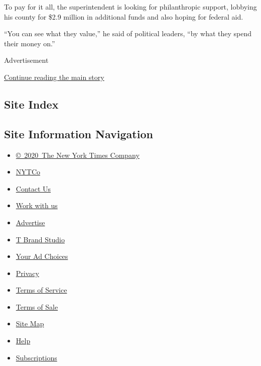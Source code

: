 To pay for it all, the superintendent is looking for philanthropic
support, lobbying his county for \$2.9 million in additional funds and
also hoping for federal aid.

``You can see what they value,'' he said of political leaders, ``by what
they spend their money on.''

Advertisement

\protect\hyperlink{after-bottom}{Continue reading the main story}

\hypertarget{site-index}{%
\subsection{Site Index}\label{site-index}}

\hypertarget{site-information-navigation}{%
\subsection{Site Information
Navigation}\label{site-information-navigation}}

\begin{itemize}
\tightlist
\item
  \href{https://help.nytimes3xbfgragh.onion/hc/en-us/articles/115014792127-Copyright-notice}{©~2020~The
  New York Times Company}
\end{itemize}

\begin{itemize}
\tightlist
\item
  \href{https://www.nytco.com/}{NYTCo}
\item
  \href{https://help.nytimes3xbfgragh.onion/hc/en-us/articles/115015385887-Contact-Us}{Contact
  Us}
\item
  \href{https://www.nytco.com/careers/}{Work with us}
\item
  \href{https://nytmediakit.com/}{Advertise}
\item
  \href{http://www.tbrandstudio.com/}{T Brand Studio}
\item
  \href{https://www.nytimes3xbfgragh.onion/privacy/cookie-policy\#how-do-i-manage-trackers}{Your
  Ad Choices}
\item
  \href{https://www.nytimes3xbfgragh.onion/privacy}{Privacy}
\item
  \href{https://help.nytimes3xbfgragh.onion/hc/en-us/articles/115014893428-Terms-of-service}{Terms
  of Service}
\item
  \href{https://help.nytimes3xbfgragh.onion/hc/en-us/articles/115014893968-Terms-of-sale}{Terms
  of Sale}
\item
  \href{https://spiderbites.nytimes3xbfgragh.onion}{Site Map}
\item
  \href{https://help.nytimes3xbfgragh.onion/hc/en-us}{Help}
\item
  \href{https://www.nytimes3xbfgragh.onion/subscription?campaignId=37WXW}{Subscriptions}
\end{itemize}
